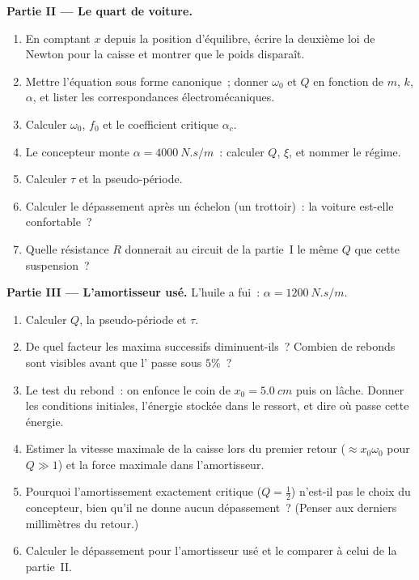 \begin{problem}
\medskip
\noindent\textbf{Partie II --- Le quart de voiture.}
\begin{enumerate}[resume]
  \item En comptant $x$ depuis la position d'équilibre, écrire la
        deuxième loi de Newton pour la caisse et montrer que le poids
        disparaît.
  \item Mettre l'équation sous forme canonique~; donner $\omega_0$ et
        $Q$ en fonction de $m$, $k$, $\alpha$, et lister les
        correspondances électromécaniques.
  \item Calculer $\omega_0$, $f_0$ et le coefficient critique
        $\alpha_c$.
  \item Le concepteur monte $\alpha = \qty{4000}{N.s/m}$~: calculer $Q$,
        $\xi$, et nommer le régime.
  \item Calculer $\tau$ et la pseudo-période.
  \item Calculer le dépassement après un échelon (un trottoir)~: la
        voiture est-elle confortable~?
  \item Quelle résistance $R$ donnerait au circuit de la partie~I le
        même $Q$ que cette suspension~?
\end{enumerate}

\medskip
\noindent\textbf{Partie III --- L'amortisseur usé.}
L'huile a fui~: $\alpha = \qty{1200}{N.s/m}$.
\begin{enumerate}[resume]
  \item Calculer $Q$, la pseudo-période et $\tau$.
  \item De quel facteur les maxima successifs diminuent-ils~? Combien de
        rebonds sont visibles avant que l' passe sous $5\%$~?
  \item Le test du rebond~: on enfonce le coin de $x_0 =
        \qty{5.0}{cm}$ puis on lâche. Donner les conditions initiales,
        l'énergie stockée dans le ressort, et dire où passe cette énergie.
  \item Estimer la vitesse maximale de la caisse lors du premier retour
        ($\approx x_0\omega_0$ pour $Q \gg 1$) et la force maximale dans
        l'amortisseur.
  \item Pourquoi l'amortissement exactement critique ($Q = \tfrac12$)
        n'est-il pas le choix du concepteur, bien qu'il ne donne aucun
        dépassement~? (Penser aux derniers millimètres du retour.)
  \item Calculer le dépassement pour l'amortisseur usé et le comparer à
        celui de la partie~II.
\end{enumerate}


\end{problem}
